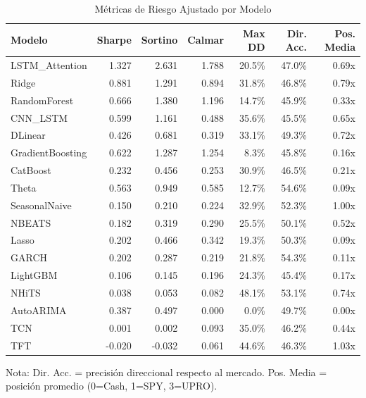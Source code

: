\begin{table}[htbp]
\centering
\caption{M\'etricas de Riesgo Ajustado por Modelo}
\label{tab:risk_metrics}
\small
\begin{tabular}{@{}lrrrrrr@{}}
\toprule
\textbf{Modelo} & \textbf{Sharpe} & \textbf{Sortino} & \textbf{Calmar} & \textbf{Max DD} & \textbf{Dir. Acc.} & \textbf{Pos. Media} \\
\midrule
LSTM\_Attention & 1.327 & 2.631 & 1.788 & 20.5\% & 47.0\% & 0.69x \\
Ridge & 0.881 & 1.291 & 0.894 & 31.8\% & 46.8\% & 0.79x \\
RandomForest & 0.666 & 1.380 & 1.196 & 14.7\% & 45.9\% & 0.33x \\
CNN\_LSTM & 0.599 & 1.161 & 0.488 & 35.6\% & 45.5\% & 0.65x \\
DLinear & 0.426 & 0.681 & 0.319 & 33.1\% & 49.3\% & 0.72x \\
GradientBoosting & 0.622 & 1.287 & 1.254 & 8.3\% & 45.8\% & 0.16x \\
CatBoost & 0.232 & 0.456 & 0.253 & 30.9\% & 46.5\% & 0.21x \\
Theta & 0.563 & 0.949 & 0.585 & 12.7\% & 54.6\% & 0.09x \\
SeasonalNaive & 0.150 & 0.210 & 0.224 & 32.9\% & 52.3\% & 1.00x \\
NBEATS & 0.182 & 0.319 & 0.290 & 25.5\% & 50.1\% & 0.52x \\
Lasso & 0.202 & 0.466 & 0.342 & 19.3\% & 50.3\% & 0.09x \\
GARCH & 0.202 & 0.287 & 0.219 & 21.8\% & 54.3\% & 0.11x \\
LightGBM & 0.106 & 0.145 & 0.196 & 24.3\% & 45.4\% & 0.17x \\
NHiTS & 0.038 & 0.053 & 0.082 & 48.1\% & 53.1\% & 0.74x \\
AutoARIMA & 0.387 & 0.497 & 0.000 & 0.0\% & 49.7\% & 0.00x \\
TCN & 0.001 & 0.002 & 0.093 & 35.0\% & 46.2\% & 0.44x \\
TFT & -0.020 & -0.032 & 0.061 & 44.6\% & 46.3\% & 1.03x \\
\bottomrule
\end{tabular}
\begin{tablenotes}
\small
\item Nota: Dir. Acc. = precisi\'on direccional respecto al mercado. Pos. Media = posici\'on promedio (0=Cash, 1=SPY, 3=UPRO).
\end{tablenotes}
\end{table}
